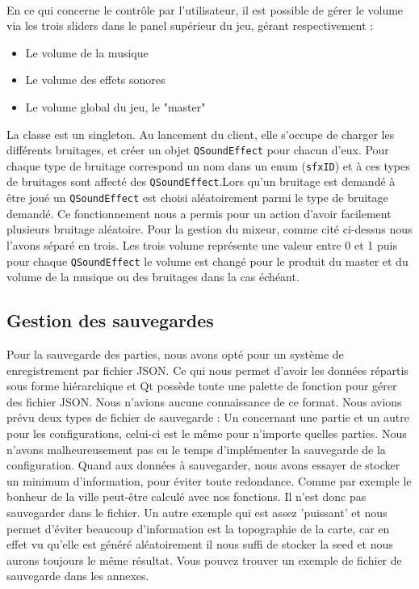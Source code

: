 \documentclass[a4paper,10pt,openany,oneside]{report}
\begin{document}
\paragraph{}
En ce qui concerne le contrôle par l'utilisateur, il est possible de gérer le volume via les trois sliders dans le panel supérieur du jeu, gérant respectivement :
\begin{itemize}
\item Le volume de la musique
\item Le volume des effets sonores
\item Le volume global du jeu, le "master"
\end{itemize}
La classe est un singleton. Au lancement du client, elle s'occupe de charger les différents bruitages, et créer un objet \texttt{QSoundEffect} pour chacun d'eux. Pour chaque type de bruitage correspond un nom dans un enum (\texttt{sfxID}) et à ces types de bruitages sont affecté des \texttt{QSoundEffect}.Lors qu'un bruitage est demandé à être joué un \texttt{QSoundEffect} est choisi aléatoirement parmi le type de bruitage demandé. Ce fonctionnement nous a permis pour un action d'avoir facilement plusieurs bruitage aléatoire.
\newline
Pour la gestion du mixeur, comme cité ci-dessus nous l'avons séparé en trois. Les trois volume représente une valeur entre 0 et 1 puis pour chaque \texttt{QSoundEffect} le volume est changé pour le produit du master et du volume de la musique ou des bruitages dans la cas échéant.
\subsection{Gestion des sauvegardes}
Pour la sauvegarde des parties, nous avons opté pour un système de enregistrement par fichier JSON. Ce qui nous permet d'avoir les données répartis sous forme hiérarchique et Qt possède toute une palette de fonction pour gérer des fichier JSON. Nous n'avions aucune connaissance de ce format.
\newline
Nous avions prévu deux types de fichier de sauvegarde : Un concernant une partie et un autre pour les configurations, celui-ci est le même pour n'importe quelles parties. Nous n'avons malheureusement pas eu le temps d'implémenter la sauvegarde de la configuration.
\newline
Quand aux données à sauvegarder, nous avons essayer de stocker un minimum d'information, pour éviter toute redondance. Comme par exemple le bonheur de la ville peut-être calculé avec nos fonctions. Il n'est donc pas sauvegarder dans le fichier. Un autre exemple qui est assez 'puissant' et nous permet d'éviter beaucoup d'information est la topographie de la carte, car en effet vu qu'elle est généré aléatoirement il nous suffi de stocker la seed et nous aurons toujours le même résultat.
\newline
Vous pouvez trouver un exemple de fichier de sauvegarde dans les annexes.
\end{document}
